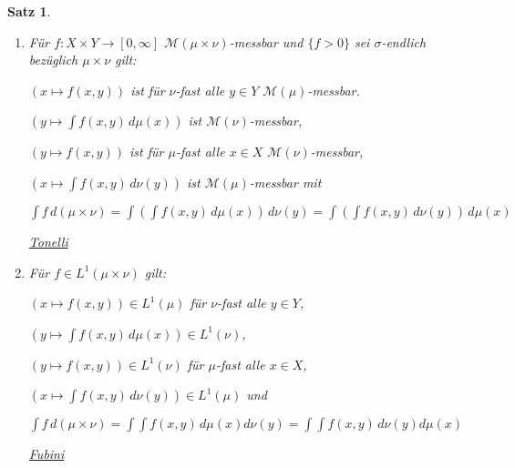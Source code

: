 \documentclass[11pt]{memoir}
\theoremstyle{changebreak}
\newtheorem{Satz}{Satz}[chapter]
\begin{document}
\begin{Satz}
\begin{enumerate}
	\item Für $f: X \times Y \rightarrow [0, \infty]$ $\mathscr M(\mu \times \nu)$-messbar und $\{f > 0\}$ sei $\sigma$-endlich bezüglich $\mu \times \nu$ gilt:
	\par
	$(x \mapsto f(x, y))$ ist für $\nu$-fast alle $y \in Y$ $\mathscr M(\mu)$-messbar.
	\par
	$\left(y \mapsto \int f(x, y) \, d\mu(x)\right) $ ist $\mathscr M(\nu)$-messbar,
	\par
	$(y \mapsto f(x, y))$ ist für $\mu$-fast alle $x \in X$ $\mathscr M(\nu)$-messbar,
	\par
	$\left( x \mapsto \int f(x, y) \, d\nu(y)\right)$ ist $\mathscr M(\mu)$-messbar mit
	\begin{center}
		$\int f \, d(\mu \times \nu) = \int \left( \int f(x, y) \, d\mu(x) \right) \, d\nu(y) = \int \left( \int f(x, y) \, d\nu(y) \right) \, d\mu(x)$ \\
	\end{center}
	\emph{\underline{Tonelli}}

	\item Für $f \in L^1(\mu \times \nu)$ gilt:
	\par
	$(x \mapsto f(x, y)) \in L^1(\mu)$ für $\nu$-fast alle $y \in Y$,
	\par
	$(y \mapsto \int f(x, y)\, d\mu(x)) \in L^1(\nu)$,
	\par
	$(y \mapsto f(x, y)) \in L^1(\nu)$ für $\mu$-fast alle $x \in X$,
	\par
	$(x \mapsto \int f(x, y) \, d\nu(y)) \in L^1(\mu)$ und
	\begin{center}
		$\int f \, d(\mu \times \nu) = \int \int f(x, y) \, d\mu(x)d\nu(y) = \int \int f(x, y) \, d\nu(y)d\mu(x)$
	\end{center}
	\emph{\underline{Fubini}}
\end{enumerate}
\end{Satz}
\end{document}
